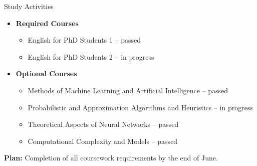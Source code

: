 \documentclass [xcolor=svgnames, t] {beamer}
\begin{document}
\begin{frame}{Study Activities}
\begin{itemize}
    \item \textbf{Required Courses}
    \begin{itemize}
        \item English for PhD Students 1 -- {\color{green!60!black}passed}
        \item English for PhD Students 2 -- {\color{blue}in progress}
    \end{itemize}
    \item \textbf{Optional Courses}
    \begin{itemize}
        \item Methods of Machine Learning and Artificial Intelligence -- {\color{green!60!black}passed}
        \item Probabilistic and Approximation Algorithms and Heuristics -- {\color{blue}in progress}
        \item Theoretical Aspects of Neural Networks -- {\color{green!60!black}passed}
        \item Computational Complexity and Models -- {\color{green!60!black}passed}
    \end{itemize}
\end{itemize}

\vfill

\begin{center}
    \textbf{Plan:} Completion of all coursework requirements by the end of June.
\end{center}
\end{frame}
\end{document}

